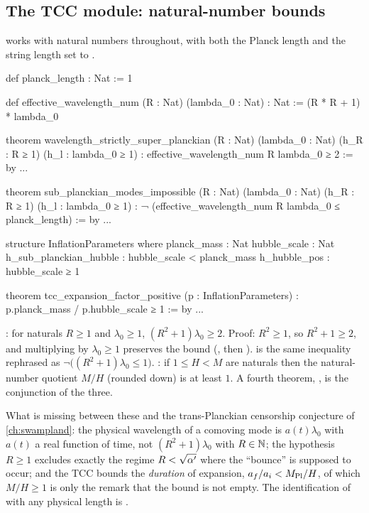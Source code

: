 \subsection{The TCC module: natural-number bounds}

 works with natural numbers throughout,
with both the Planck length and the string length set to .
\begin{leancode}
def planck_length : Nat := 1

def effective_wavelength_num (R : Nat) (lambda_0 : Nat) : Nat :=
  (R * R + 1) * lambda_0

theorem wavelength_strictly_super_planckian
    (R : Nat) (lambda_0 : Nat) (h_R : R ≥ 1) (h_l : lambda_0 ≥ 1) :
    effective_wavelength_num R lambda_0 ≥ 2 := by ...

theorem sub_planckian_modes_impossible
    (R : Nat) (lambda_0 : Nat) (h_R : R ≥ 1) (h_l : lambda_0 ≥ 1) :
    ¬ (effective_wavelength_num R lambda_0 ≤ planck_length) := by ...

structure InflationParameters where
  planck_mass : Nat
  hubble_scale : Nat
  h_sub_planckian_hubble : hubble_scale < planck_mass
  h_hubble_pos : hubble_scale ≥ 1

theorem tcc_expansion_factor_positive (p : InflationParameters) :
    p.planck_mass / p.hubble_scale ≥ 1 := by ...
\end{leancode}
\begin{leanbox}
: for naturals $R\ge1$ and $\lambda_0\ge1$,
$(R^2+1)\lambda_0\ge2$. Proof: $R^2\ge1$, so $R^2+1\ge2$, and multiplying by
$\lambda_0\ge1$ preserves the bound (, then ).
 is the same inequality rephrased as
$\neg\bigl((R^2+1)\lambda_0\le1\bigr)$. : if
$1\le H<M$ are naturals then the natural-number quotient $M/H$ (rounded down) is at least $1$.
A fourth theorem, , is the conjunction of the three.

What is missing between these and the trans-Planckian censorship
conjecture of \cref{ch:swampland}: the physical wavelength of a comoving mode is $a(t)\lambda_0$ with
$a(t)$ a real function of time, not $(R^2+1)\lambda_0$ with $R\in\mathbb{N}$; the hypothesis $R\ge1$
excludes exactly the regime $R<\sqrt{\alpha'}$ where the ``bounce'' is supposed to occur; and the
TCC bounds the \emph{duration} of expansion, $a_f/a_i<M_{\rm Pl}/H$, of which $M/H\ge1$ is
only the remark that the bound is not empty. The identification of
 with any physical length is \TC{}.
\end{leanbox}

